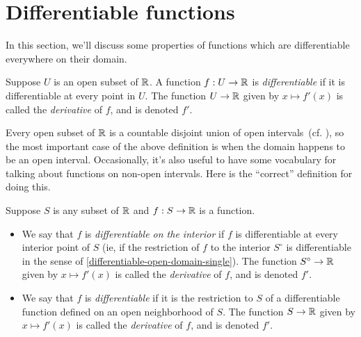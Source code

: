 \section{Differentiable functions} \label{single-differentiable}

In this section, we'll discuss some properties of functions which are differentiable everywhere on their domain. 

\begin{definition} \label{differentiable-open-domain-single}  
	Suppose $U$ is an open subset of $\mathbb{R}$. A function $f : U \to \mathbb{R}$ is \emph{differentiable} if it is differentiable at every point in $U$. The function $U \to \mathbb{R}$ given by $x \mapsto f'(x)$ is called the \emph{derivative} of $f$, and is denoted $f'$. 
\end{definition}

Every open subset of $\mathbb{R}$ is a countable disjoint union of open intervals\footnotemark\ (cf. \cite[theorem 6.17]{protter-morrey}), so the most important case of the above definition is when the domain happens to be an open interval. Occasionally, it's also useful to have some vocabulary for talking about functions on non-open intervals. Here is the ``correct'' definition for doing this.


\begin{definition} \label{differentiable-any-domain-single}
	Suppose $S$ is any subset of $\mathbb{R}$ and $f : S \to \mathbb{R}$ is a function.
	\begin{itemize}
		\item We say that $f$ is \emph{differentiable on the interior} if $f$ is differentiable at every interior point of $S$ (ie, if the restriction of $f$ to the interior $S^\circ$ is differentiable in the sense of \cref{differentiable-open-domain-single}). The function $S^\circ \to \mathbb{R}$ given by $x \mapsto f'(x)$ is called the \emph{derivative} of $f$, and is denoted $f'$. 
		\item We say that $f$ is \emph{differentiable} if it is the restriction to $S$ of a differentiable function defined on an open neighborhood of $S$.  The function $S \to \mathbb{R}$ given by $x \mapsto f'(x)$ is called the \emph{derivative} of $f$, and is denoted $f'$. 
	\end{itemize} 
\end{definition}

